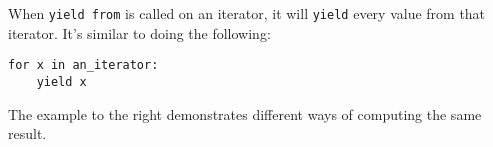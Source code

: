 When \lstinline$yield from$ is called on an iterator, it will \lstinline$yield$
every value from that iterator. It's similar to doing the following:

\begin{lstlisting}
for x in an_iterator:
    yield x
\end{lstlisting}

The example to the right demonstrates different ways of computing the same
result.
